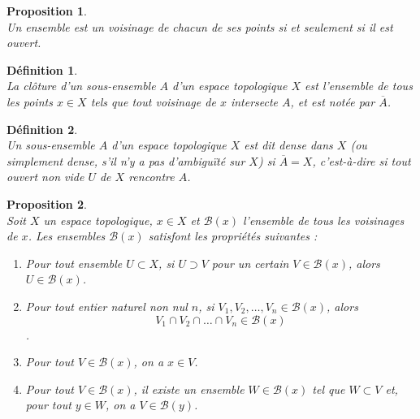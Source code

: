 \documentclass[a4paper, 14pt]{report}
\newtheorem{definition}{Définition}[section]
\newtheorem{proposition}{Proposition}[section]
\begin{document}
\begin{onehalfspace}
{			
			\begin{proposition} \cite{bourbaki2013general} \\
				Un ensemble est un voisinage de chacun de ses points si et seulement si il est ouvert.
			\end{proposition}
			
			
			\begin{definition} \cite{bourbaki2013general} \\
				La clôture d'un sous-ensemble \( A \) d'un espace topologique \( X \) est l'ensemble de tous les points \( x \in X \) tels que tout voisinage de \( x \) intersecte \( A \), et est notée par \( \overline{A} \).
			\end{definition}
			
			\begin{definition}  \cite{bourbaki2013general} \\
				Un sous-ensemble \( A \) d'un espace topologique \( X \) est dit dense dans \( X \) (ou simplement dense, s'il n'y a pas d'ambiguïté sur \( X \)) si \(\overline{A} = X\), c'est-à-dire si tout ouvert non vide \( U \) de \( X \) rencontre \( A \).
			\end{definition}
			
			
			
			\begin{proposition} \cite{bourbaki2013general} \\
				Soit \( X \) un espace topologique, \( x \in X \) et \( \mathcal{B}(x) \) l'ensemble de tous les voisinages de \( x \). Les ensembles \( \mathcal{B}(x) \) satisfont les propriétés suivantes :
				\begin{enumerate}
					\item[(V$_1$)] Pour tout ensemble \( U \subset X \), si \( U \supset V \) pour un certain \( V \in \mathcal{B}(x) \), alors \( U \in \mathcal{B}(x) \).
					\item[(V$_2$)] Pour tout entier naturel non nul \( n \), si \( V_1, V_2, \dots, V_n \in \mathcal{B}(x) \), alors \[ V_1 \cap V_2 \cap \dots \cap V_n \in \mathcal{B}(x) \]  .
					\item[(V$_3$)] Pour tout \( V \in \mathcal{B}(x) \), on a \( x \in V \).
					\item[(V$_4$)] Pour tout \( V \in \mathcal{B}(x) \), il existe un ensemble \( W \in \mathcal{B}(x) \) tel que \( W \subset V \) et, pour tout \( y \in W \), on a \( V \in \mathcal{B}(y) \).
				\end{enumerate}
			\end{proposition}
			
}
\end{onehalfspace}
\end{document}
